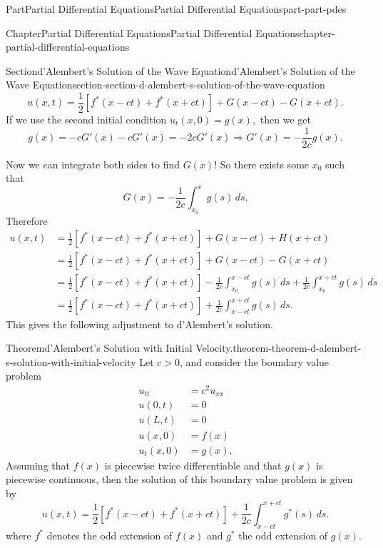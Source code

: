\documentclass[twoside,10pt,]{book}
\numberwithin{equation}{part}
\newcommand{\gt}{>}
\newcommand{\amp}{&}
\begin{document}
\begin{partptx}{Part}{Partial Differential Equations}{}{Partial Differential Equations}{}{}{part-part-pdes}
\begin{chapterptx}{Chapter}{Partial Differential Equations}{}{Partial Differential Equations}{}{}{chapter-partial-differential-equations}
\begin{sectionptx}{Section}{d'Alembert's Solution of the Wave Equation}{}{d'Alembert's Solution of the Wave Equation}{}{}{section-section-d-alembert-s-solution-of-the-wave-equation}
\begin{equation*}
u(x,t) = \frac{1}{2}[f^{*}(x-ct)+f^{*}(x+ct)] + G(x-ct) - G(x+ct).
\end{equation*}
If we use the second initial condition \(u_{t}(x,0) = g(x),\) then we get%
\begin{equation*}
g(x) = -cG'(x) - cG'(x) = -2cG'(x) \Rightarrow G'(x) = -\frac{1}{2c}g(x).
\end{equation*}
%
\par
Now we can integrate both sides to find \(G(x)\)! So there exists some \(x_{0}\) such that%
\begin{equation*}
G(x) = -\frac{1}{2c}\int_{x_{0}}^{x}g(s)\,ds.
\end{equation*}
Therefore%
\begin{align*}
u(x,t) \amp = \frac{1}{2}[f^{*}(x-ct)+f^{*}(x+ct)] + G(x-ct) + H(x+ct) \\
\amp = \frac{1}{2}[f^{*}(x-ct)+f^{*}(x+ct)] + G(x-ct) - G(x+ct) \\
\amp = \frac{1}{2}[f^{*}(x-ct)+f^{*}(x+ct)] - \frac{1}{2c}\int_{x_{0}}^{x-ct}g(s)\,ds + \frac{1}{2c}\int_{x_{0}}^{x+ct}g(s)\,ds \\
\amp = \frac{1}{2}[f^{*}(x-ct)+f^{*}(x+ct)] + \frac{1}{2c}\int_{x-ct}^{x+ct}g(s)\,ds \text{.}
\end{align*}
This gives the following adjustment to d'Alembert's solution.%
\begin{theorem}{Theorem}{d'Alembert's Solution with Initial Velocity.}{}{theorem-theorem-d-alembert-s-solution-with-initial-velocity}%
%
Let \(c\gt0\), and consider the boundary value problem%
%
\begin{align*}
u_{tt} \amp = c^{2}u_{xx} \\
u(0,t) \amp = 0 \\
u(L,t) \amp = 0 \\
u(x,0) \amp = f(x) \\
u_{t}(x,0) \amp = g(x). 
\end{align*}
Assuming that \(f(x)\) is piecewise twice differentiable and that \(g(x)\) is piecewise continuous, then the solution of this boundary value problem is given by%
\begin{equation*}
u(x,t) = \frac{1}{2}[f^{*}(x-ct)+f^{*}(x+ct)] + \frac{1}{2c}\int_{x-ct}^{x+ct}g^{*}(s)\,ds.
\end{equation*}
where \(f^{*}\) denotes the odd extension of \(f(x)\) and \(g^{*}\) the odd extension of \(g(x)\).%
\end{theorem}

\end{sectionptx}
\end{chapterptx}
\end{partptx}
\end{document}
